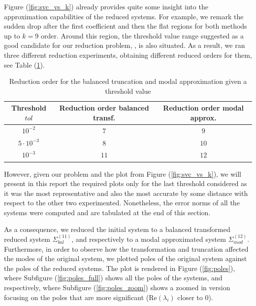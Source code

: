 \documentclass[10pt,a4paper]{article}
\begin{document}
Figure (\ref{fig:svc_vs_k}) already provides quite some insight into the approximation capabilities of the reduced systems. For example, we remark the sudden drop after the first coefficient and then the flat regions for both methods up to $k = 9$ order. Around this region, the threshold value range suggested as a good candidate for our reduction problem, \cite{task}, is also situated. As a result, we ran three different reduction experiments, obtaining different reduced orders for them, see Table (\ref{tab:red}).

\begin{table}[!ht]
\centering
\begin{tabular}{|c | c | c |}\hline
Threshold $tol$ & Reduction order balanced transf. & Reduction order modal approx.\\\hline
$10^{-2}$ & $7$ & $9$\\\hline
$5\cdot10^{-3}$ & $ 8$ & $10$ \\\hline
$10^{-3}$ & $11$& $12$\\\hline 
\end{tabular}
\caption{Reduction order for the balanced truncation and modal approximation given a threshold value}\label{tab:red}
\end{table}

However, given our problem and the plot from Figure (\ref{fig:svc_vs_k}), we will present in this report the required plots only for the last threshold considered as it was the most representative and also the most accurate by some distance with respect to the other two experimented. Nonetheless, the error norms of all the systems were computed and are tabulated at the end of this section.

As a consequence, we reduced the initial system to a balanced transformed reduced system $\Sigma^{(11)}_{bal}$, and respectively to a modal approximated system $\Sigma^{(12)}_{mod}$. Furthermore, in order to observe how the transformation and truncation affected the modes of the original system, we plotted poles of the original system against the poles of the reduced systems. The plot is rendered in Figure (\ref{fig:poles}), where Subfigure (\ref{fig:poles_full}) shows all the poles of the systems, and respectively, where Subfigure (\ref{fig:poles_zoom}) shows a zoomed in version focusing on the poles that are more significant ($\text{Re}(\lambda_i)$ closer to $0$).
\end{document}
